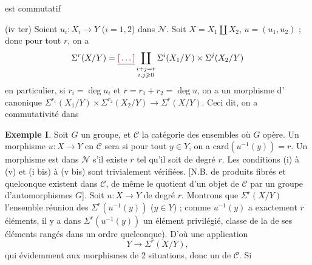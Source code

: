 \documentclass[11pt,a4paper]{article}
\begin{document}

est commutatif

(iv ter) Soient $u_i : X_i \to Y$ ($i = 1, 2$) dans $\mathcal{N}$.
  Soit $X = X_1 \amalg X_2$, $u = (u_1, u_2)$ ; donc pour tout
   $r$, on a
  \[
    \Sigma^r(X/Y) = \struck{\ill{}} \coprod_{\substack{i+j=r\\ i,j \geqslant 0}}
    \Sigma^i(X_1/Y) \times \Sigma^j(X_2/Y)
  \]
  en particulier, si $r_i = \deg u_i$ et $r = r_1 + r_2 = \deg u$, on a un
  morphisme d' canonique
  $\Sigma^{r_1}(X_1/Y) \times \Sigma^{r_2}(X_2/Y) \to \Sigma^r(X/Y)$.
  Ceci dit, on a commutativité dans



\textbf{Exemple I}. Soit $G$ un groupe, et $\mathcal{C}$ la catégorie des
ensembles où $G$ opère. Un morphisme $u : X \to Y$ en $\mathcal{C}$ sera
  si
pour tout $y \in Y$, \struck{\ill{}} on a $\mathrm{card}(u^{-1}(y)) = r$.
Un morphisme est dans $\mathcal{N}$ s'il existe $r$ tel qu'il soit de degré
$r$. Les conditions (i) à (v) et (i bis) à (v bis) sont trivialement
vérifiées. [N.B. \struck{\ill{}} de produits fibrés et  
quelconque existent dans $\mathcal{C}$, \ill{} de même le quotient d'un
objet de $\mathcal{C}$ par un groupe d'automorphismes $G$]. Soit
$u : X \to Y$ de degré $r$. Montrons que $\Sigma^r(X/Y)$ 
 l'ensemble \struck{\ill{}} réunion des $\Sigma^r(u^{-1}(y))$
($y \in Y$) ; comme $u^{-1}(y)$ a exactement $r$ éléments,
\struck{\ill{}} il y a dans $\Sigma^r(u^{-1}(y))$ un élément privilégié,
classe de la  de ses éléments rangés dans un ordre quelconque). D'où
une application 
\[
  Y \to \Sigma^r(X/Y),
\]
qui évidemment  aux morphismes de 2 situations, donc 
\ill{} un \struck{\ill{}} \ill{} de $\mathcal{C}$. Si 
\end{document}
